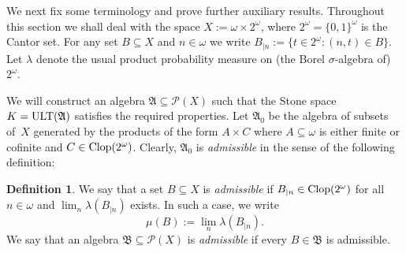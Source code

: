 \documentclass[12pt]{amsart}
\newcommand{\sub}{\subseteq}
\newcommand{\alg}{\mathfrak A}
\newcommand{\algb}{\mathfrak B}
\newcommand{\ult}{{\rm ULT}}
\newcommand{\clop}{\protect{\rm Clop} }
\newcommand{\0}{\protect{\bf 0}}
\newcommand{\1}{\protect{\bf 1}}
\theoremstyle{definition}
\newtheorem{definition}[theo]{Definition}
\theoremstyle{remark}
\numberwithin{equation}{section}
\begin{document}
We next fix some terminology and prove further auxiliary results. 
Throughout this section we shall deal with the space $X:=\omega\times 2^\omega$, where $2^\omega=\{0,1\}^\omega$ is the Cantor set. 
For any set $B\sub X$ and $n\in\omega$ we
write $B_{|n}:=\{t\in 2^\omega: (n,t)\in B\}$.
Let $\lambda$ denote the usual product probability 
measure on (the Borel $\sigma$-algebra of) $2^\omega$. 

We will construct an algebra $\alg \sub \mathcal{P}(X)$
such that the Stone space $K=\ult(\alg)$ satisfies the required properties.  
Let $\alg_0$ be the algebra of subsets of~$X$ generated
by the products of the form $A \times C$ where $A \sub \omega$
is either finite or cofinite and $C\in \clop(2^\omega)$. 
Clearly, $\alg_0$ is {\em admissible} in the sense of the following definition:

\begin{definition}\label{ex1:1}
We say that a set $B \sub X$ is {\em admissible} if 
$B_{|n}\in\clop(2^\omega)$ for all $n\in\omega$ and $\lim_n \lambda(B_{|n})$ exists.
In such a case, we write 
$$
	\mu(B):=\lim_n \lambda(B_{|n}).
$$
We say that an algebra $\algb \sub \mathcal{P}(X)$ is {\em admissible} if every $B\in\algb$ is admissible.
\end{definition}
\end{document}
